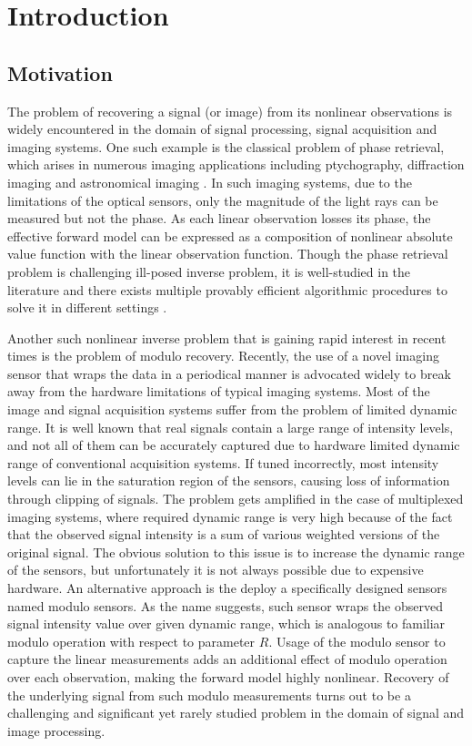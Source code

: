 \section{Introduction}
\label{sec:intro}
\subsection{Motivation}
The problem of recovering a signal (or image) from its nonlinear observations is widely encountered in the domain of signal processing, signal acquisition and imaging systems. One such example is the classical problem of phase retrieval, which arises in numerous imaging applications including ptychography, diffraction imaging and astronomical imaging \cite{shechtman2015phase, maiden2009improved}. In such imaging systems, due to the limitations of the optical sensors, only the magnitude of the light rays can be measured but not the phase. As each linear observation losses its phase, the effective forward model can be expressed as a composition of nonlinear absolute value function with the linear observation function. Though the phase retrieval problem is challenging ill-posed inverse problem, it is well-studied in the literature and there exists multiple provably efficient algorithmic procedures to solve it in different settings \cite{Netrapalli2013,candes2013phaselift,candes2015phase,wang2016sparse}.

Another such nonlinear inverse problem that is gaining rapid interest in recent times is the problem of modulo recovery. Recently, the use of a novel imaging sensor that wraps the data in a periodical manner is advocated widely to break away from the hardware limitations of typical imaging systems. Most of the image and signal acquisition systems suffer from the problem of limited dynamic range. It is well known that real signals contain a large range of intensity levels, and not all of them can be accurately captured due to hardware limited dynamic range of conventional acquisition systems. If tuned incorrectly, most intensity levels can lie in the saturation region of the sensors, causing loss of information through clipping of signals. The problem gets amplified in the case of multiplexed imaging systems, where required dynamic range is very high because of the fact that the observed signal intensity is a sum of various weighted versions of the original signal. The obvious solution to this issue is to increase the dynamic range of the sensors, but unfortunately it is not always possible due to expensive hardware. An alternative approach is the deploy a specifically designed sensors named modulo sensors. As the name suggests, such sensor wraps the observed signal intensity value over given dynamic range, which is analogous to familiar modulo operation with respect to parameter $R$. Usage of the modulo sensor to capture the linear measurements adds an additional effect of modulo operation over each observation, making the forward model highly nonlinear. Recovery of the underlying signal from such modulo measurements turns out to be a challenging and significant yet rarely studied problem in the domain of signal and image processing. 

